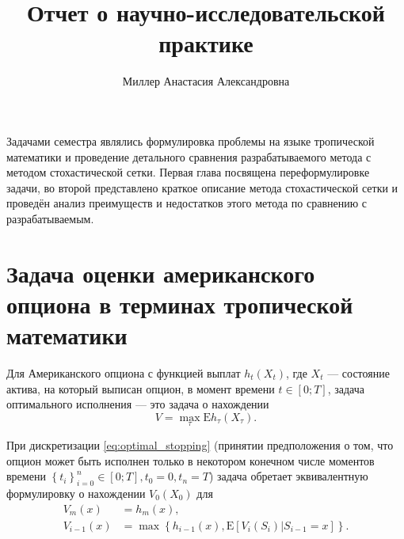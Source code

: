 \documentclass[specialist,
               substylefile = ../spbu.rtx,
               subf,href,colorlinks=true, 12pt]{disser}
\newcommand{\ev}{\mathrm{E}}
\begin{document}
%
%


\title{Отчет о научно-исследовательской практике}


\author{Миллер Анастасия Александровна}


\date{\number\year}

\maketitle

\tableofcontents

\intro
	Задачами семестра являлись формулировка проблемы на языке тропической математики и проведение детального сравнения разрабатываемого метода с методом стохастической сетки. Первая глава посвящена переформулировке задачи, во второй представлено краткое описание метода стохастической сетки и проведён анализ преимуществ и недостатков этого метода по сравнению с разрабатываемым.

\chapter{Задача оценки американского опциона в терминах тропической математики}
Для Американского опциона с функцией выплат $h_t\left(X_t\right)$, где $X_t$ — состояние актива, на который выписан опцион, в момент времени $t\in\left[0;T\right]$, задача оптимального исполнения — это задача о нахождении \begin{equation}\label{eq:optimal_stopping}V = \max_{\tau} \ev h_\tau\left(X_\tau\right).\end{equation}

При дискретизации \eqref{eq:optimal_stopping} (принятии предположения о том, что опцион может быть исполнен только в некотором конечном числе моментов времени $\left\lbrace t_i\right\rbrace_{i=0}^n \in \left[0;T\right], t_0 = 0, t_n = T$) задача обретает эквивалентную формулировку о нахождении $V_0\left(X_0\right)$ для
\begin{equation}\label{eq:option-recursive}\begin{aligned}
			V_m\left(x\right) &= h_m\left(x\right), \\
			V_{i-1}\left(x\right) &= \max\left\lbrace h_{i-1}\left(x\right), \ev\left[V_i\left(S_i\right)|S_{i-1}=x\right]\right\rbrace.
\end{aligned}\end{equation}
\end{document}
